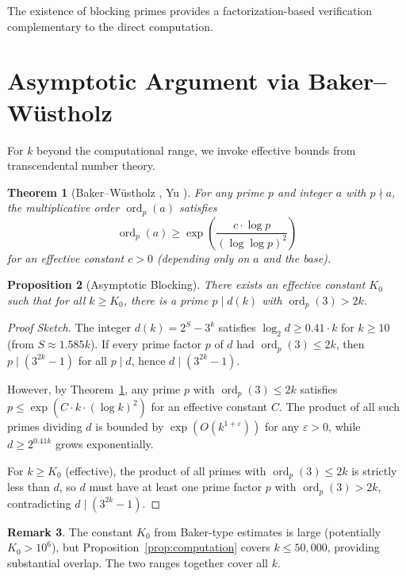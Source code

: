 \documentclass[12pt,a4paper]{amsart}
\theoremstyle{plain}
\newtheorem{theorem}{Theorem}[section]
\newtheorem{proposition}[theorem]{Proposition}
\theoremstyle{definition}
\newtheorem{remark}[theorem]{Remark}
\newcommand{\ord}{\operatorname{ord}}
\begin{document}
The existence of blocking primes provides a factorization-based verification complementary to the direct computation.

\section{Asymptotic Argument via Baker--Wüstholz}
\label{sec:asymptotic}

For $k$ beyond the computational range, we invoke effective bounds from transcendental number theory.

\begin{theorem}[Baker--Wüstholz \cite{BakerWustholz1993}, Yu \cite{Yu2007}]
\label{thm:baker_wustholz}
For any prime $p$ and integer $a$ with $p \nmid a$, the multiplicative order $\ord_p(a)$ satisfies
\[
\ord_p(a) \geq \exp\left(\frac{c \cdot \log p}{(\log \log p)^2}\right)
\]
for an effective constant $c > 0$ (depending only on $a$ and the base).
\end{theorem}

\begin{proposition}[Asymptotic Blocking]
\label{prop:asymptotic}
There exists an effective constant $K_0$ such that for all $k \geq K_0$, there is a prime $p \mid d(k)$ with $\ord_p(3) > 2k$.
\end{proposition}

\begin{proof}[Proof Sketch]
The integer $d(k) = 2^S - 3^k$ satisfies $\log_2 d \geq 0.41 \cdot k$ for $k \geq 10$ (from $S \approx 1.585 k$). If every prime factor $p$ of $d$ had $\ord_p(3) \leq 2k$, then $p \mid (3^{2k} - 1)$ for all $p \mid d$, hence $d \mid (3^{2k} - 1)$.

However, by Theorem~\ref{thm:baker_wustholz}, any prime $p$ with $\ord_p(3) \leq 2k$ satisfies $p \leq \exp(C \cdot k \cdot (\log k)^2)$ for an effective constant $C$. The product of all such primes dividing $d$ is bounded by $\exp(O(k^{1+\varepsilon}))$ for any $\varepsilon > 0$, while $d \geq 2^{0.41k}$ grows exponentially.

For $k \geq K_0$ (effective), the product of all primes with $\ord_p(3) \leq 2k$ is strictly less than $d$, so $d$ must have at least one prime factor $p$ with $\ord_p(3) > 2k$, contradicting $d \mid (3^{2k} - 1)$.
\end{proof}

\begin{remark}
The constant $K_0$ from Baker-type estimates is large (potentially $K_0 > 10^6$), but Proposition~\ref{prop:computation} covers $k \leq 50{,}000$, providing substantial overlap. The two ranges together cover all $k$.
\end{remark}
\end{document}
